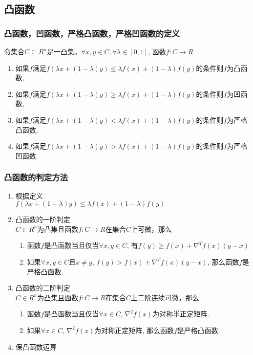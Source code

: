 \documentclass[UTF8]{article}
\begin{document}
	
\subsection{凸函数}
	
		\subsubsection{凸函数，凹函数，严格凸函数，严格凹函数的定义}
		令集合$C \subseteq R^n$是一凸集。$\forall x, y \in C, \forall \lambda \in [0, 1]$, 函数$f : C \rightarrow R$
		\begin{enumerate}
			\item 如果$f$满足$f(\lambda x + (1 - \lambda)y) \leq \lambda f(x) + (1 - \lambda)f(y)$的条件则$f$为凸函数, 
			\item 如果$f$满足$f(\lambda x + (1 - \lambda)y) \geq \lambda f(x) + (1 - \lambda)f(y)$的条件则$f$为凹函数, 
			\item 如果$f$满足$f(\lambda x + (1 - \lambda)y) < \lambda f(x) + (1 - \lambda)f(y)$的条件则$f$为严格凸函数, 
			\item 如果$f$满足$f(\lambda x + (1 - \lambda)y) > \lambda f(x) + (1 - \lambda)f(y)$的条件则$f$为严格凹函数.
		\end{enumerate}
		\subsubsection{凸函数的判定方法}
		\begin{enumerate}
			\item 根据定义\\ \quad 
			$f(\lambda x + (1 - \lambda)y) \leq \lambda f(x) + (1 - \lambda)f(y)$
			\item 凸函数的一阶判定\\ \quad  
			$C \in R^n$为凸集且函数$f : C \rightarrow R$在集合$C$上可微，那么
			\begin{enumerate}
				\item 函数$f$是凸函数当且仅当$\forall x, y \in C$, 有$f(y) \geq f(x) + \nabla^T f(x)(y - x)$
				\item 如果$\forall x, y \in C$且$x \neq y$, $f(y) > f(x) + \nabla^T f(x)(y - x)$, 那么函数$f$是严格凸函数.
			\end{enumerate}
			\item 凸函数的二阶判定\\ \quad 
			$C \in R^n$为凸集且函数$f:C \rightarrow R$在集合$C$上二阶连续可微，那么
			\begin{enumerate}
				\item 函数$f$是凸函数当且仅当$\forall x \in C$, $\nabla^2 f(x)$为对称半正定矩阵.
				\item 如果$\forall x \in C$, $\nabla^2 f(x)$为对称正定矩阵, 那么函数$f$是严格凸函数.
			\end{enumerate}
			\item 保凸函数运算
		\end{enumerate}
\end{document}
